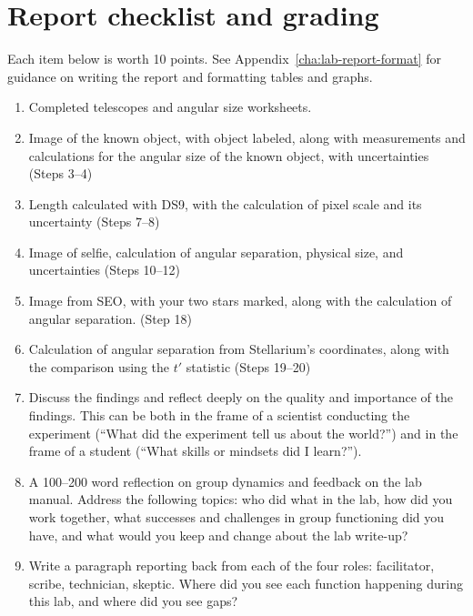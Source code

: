 \section{Report checklist and grading}

Each item below is worth 10 points. See Appendix\ \ref{cha:lab-report-format} for guidance on writing the report and formatting tables and graphs.

\begin{enumerate}
	
	\item Completed telescopes and angular size worksheets.
	
	\item Image of the known object, with object labeled, along with measurements and calculations for the angular size of the known object, with uncertainties (Steps 3--4)
	
	\item Length calculated with DS9, with the calculation of pixel scale and its uncertainty (Steps 7--8)
	
	\item Image of selfie, calculation of angular separation, physical size, and uncertainties (Steps 10--12)
	
	\item Image from SEO, with your two stars marked, along with the calculation of angular separation. (Step 18)
	
	\item Calculation of angular separation from Stellarium's coordinates, along with the comparison using the $t'$ statistic (Steps 19--20)
	
	\item Discuss the findings and reflect deeply on the quality and importance of the findings. This can
	be both in the frame of a scientist conducting the experiment (“What did the experiment tell us
	about the world?”) and in the frame of a student (“What skills or mindsets did I learn?”).
	
	\item A 100–200 word reflection on group dynamics and feedback on the lab manual. Address the
	following topics: who did what in the lab, how did you work together, what successes and
	challenges in group functioning did you have, and what would you keep and change about the
	lab write-up?
	
	\item Write a paragraph reporting back from each of the four roles: facilitator, scribe, technician,
	skeptic. Where did you see each function happening during this lab, and where did you see
	gaps?
\end{enumerate}